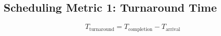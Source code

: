 \documentclass[8pt,a4paper,landscape]{extarticle}
\begin{document}
\pagestyle{empty}

\begin{multicols*}{3}
% 
% 
% 
% 

% 
% 
% 
% 
% 
% 
% 
% 
% 
% 
% 
% 
% 
% 
% 
% 
% 
% 
% 
% 
\section*{Scheduling Metric 1: Turnaround Time}
\begin{equation}
  \label{eq:turnaround}
  T_{\text{turnaround}} = T_{\text{completion}} - T_{\text{arrival}}
\end{equation}
\begin{minipage}{.5\linewidth}

\end{minipage}
\end{multicols*}
\end{document}
